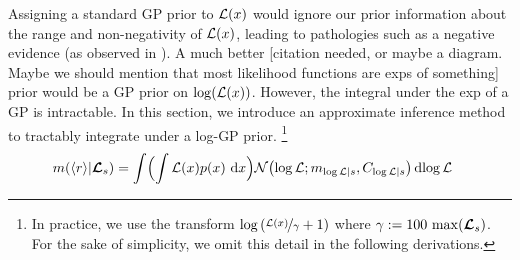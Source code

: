 \documentclass{article}
\begin{document}
Assigning a standard GP prior to $\lfn(\lfv)$ would ignore our prior information about the range and non-negativity of $\lfn(\lfv)$, leading to pathologies such as a negative evidence (as observed in \citep{BZMonteCarlo}).  A much better [citation needed, or maybe a diagram.  Maybe we should mention that most likelihood functions are exps of something] prior would be a GP prior on $\log(\lfn(x))$.  However, the integral under the exp of a GP is intractable.  In this section, we introduce an approximate inference method to tractably integrate under a log-GP prior.
\footnote{In practice, we use the transform 
$\log\left(\nicefrac{\lfn(\lfv)}{\gamma} + 1\right)$
where $\gamma \deq 100\, \max(\vr_s)$.  For the sake of simplicity, we omit this detail in the following derivations.}
%
%
%
\begin{align}
\mean{\inty{r}}{\vr_s}
&  =\int \Bigl( \int \lfn(\lfv)\po{\lfv}\,\ud\lfv\Bigr)
\N{\tr}{\meancondfn{\tr}{s}}{\covcondfn{\tr}{s}} \ud \tr \nonumber
\end{align}
\end{document}
